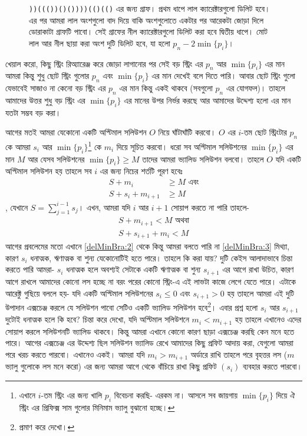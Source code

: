 \begin{solution}
\begin{figure}[h]
  \caption{\texttt{))((())()())))(()(()} এর জন্য গ্রাফ। প্রথম ধাপে লাল ক্যারেক্টারগুলো ডিলিট হবে। এর পর আমরা লাল অংশগুলো বাদ দিয়ে বাকি অংশগুলোতে একটার পর আরেকটা জোড়া দিলে ডোরাকাটা গ্রাফটি পাবো। সেই গ্রাফের নীল ক্যারেক্টারগুলো ডিলিট করা হবে দ্বিতীয় ধাপে। মোট লাল আর নীল ছায়া করা অংশ দুটি  ডিলিট হবে, যা হলো $p_n - 2\min\{p_i\}$।}
\end{figure}
খেয়াল করো, কিছু স্ট্রিং রিঅ্যারেঞ্জ করে জোড়া লাগানোর পর সেই বড় স্ট্রিং এর $p_n$ আর $\min\{p_i\}$ এর মান আমরা কিন্তু শুধু ছোট স্ট্রিং গুলোর $p_n$ এবং $\min\{p_i\}$ এর মান দেখেই বলে দিতে পারি। আবার ছোট স্ট্রিং গুলো যেভাবেই সাজাও না কেনো বড় স্ট্রিং এর $p_n$ এর মান কিন্তু একই থাকবে (সবগুলো $p_n$ এর যোগফল)। তাহলে আমাদের উত্তর শুধু বড় স্ট্রিং এর $\min\{p_i\}$ এর মানের উপর নির্ভর করছে আর আমাদের উদ্দেশ্য হলো এর মান যতটা সম্ভব বড় করা।

আগের মতই আমরা যেকোনো একটি অপ্টিমাল সলিউশন $O$ নিয়ে ঘাঁটাঘাঁটি করবো। $O$ এর $i$-তম ছোট স্ট্রিংটার $p_n$ কে আমরা $s_i$ আর $\min\{p_i\}$\footnote{এখানে $i$-তম স্ট্রিং এর জন্য খালি $p_i$ বিবেচনা করছি- এরকম না। আসলে সব জায়গায় $\min\{p_i\}$ দিয়ে ঐ স্ট্রিং এর প্রিফিক্স সাম গুলোর মিনিমাম ভ্যালু বুঝানো হচ্ছে।} কে $m_i$ দিয়ে সূচিত করবো। ধরো সব অপ্টিমাল সলিউশনের $\min\{p_i\}$ এর মান $M$ আর যেসব সলিউশনের $\min\{p_i\} \ge M$ তাদের আমরা ভ্যালিড সলিউশন বলবো। তাহলে $O$ যদি একটি অপ্টিমাল সলিউশন হয় তাহলে সব $i$ এর জন্য নিচের শর্তটি পূরণ হবেঃ
\begin{align}
  S + m_i &\ge M \text{ এবং} \label{delMinBra:1}\\
  S + s_i + m_{i+1} &\ge M \label{delMinBra:2}
\end{align}
, যেখানে $S = \sum_{j=1}^{i-1} s_j$। এখন, আমরা যদি $i$ আর $i+1$ সোয়াপ করতে না পারি তাহলে-
\begin{align}
  S + m_{i+1} < M \text{ অথবা} \label{delMinBra:3} \\
  S + s_{i+1} + m_i < M \label{delMinBra:4}
\end{align}
আগের প্রবলেমের মতো এখানে \eqref{delMinBra:2} থেকে কিন্তু আমরা বলতে পারি না \eqref{delMinBra:3} মিথ্যা, কারণ $s_i$ ধনাত্মক, ঋণাত্মক বা শুন্য যেকোনোটিই হতে পারে। তাহলে কি করা যায়? দুটি কেইস আলাদাভাবে চিন্তা করতে পারি আমরা- $s_i$ ধনাত্মক হলে  অবশ্যই সেটাকে একটি  ঋণাত্মক বা শুন্য $s_{i+1}$ এর আগে রাখা উচিত, কারণ আগে রাখলে আমাদের কোনো লস হচ্ছে না বরং পরের কোনো স্ট্রিং-এ এই লাভটা কাজে লেগে যেতে পারে। এটাকে আরেক্টু গুছিয়ে বললে হয়- যদি একটি অপ্টিমাল সলিউশনের $s_i \le 0$ এবং $s_{i+1} > 0$ হয় তাহলে আমরা এই দুটি উপাদান এক্সচেঞ্জ করলে যে সলিউশন পাবো সেটিও একটি ভ্যালিড সলিউশন হবে\footnote{প্রমাণ করে দেখো।}। এবার প্রশ্ন হলো $s_i$ আর $s_{i+1}$ দুটোই ধনাত্মক হলে কি হবে? চিন্তা করে দেখো, যদি অপ্টিমাল সলিউশনে $m_i < m_{i+1}$ হয় তাহলে এখানেও এদের সোয়াপ করলে সলিউশনটি ভ্যালিড থাকবে। কিন্তু আমরা এখানে কোনো কারণ ছাড়া এক্সচেঞ্জ করছি কেন মনে হতে পারে। আগের এক্সচেঞ্জ এর উদ্দেশ্য ছিল সলিউশন ভ্যালিড রেখে আমাদের কিছু প্রফিট আদায় করা, যেগুলো আমরা পরে খরচ করতে পারবো। এখানেও একই। আমরা যদি $m_i > m_{i+1}$ অর্ডারে রাখি তাহলে পরে বৃহত্তর লস ($m$ ভ্যালু গুলোকে লস মনে করো) এর জন্য আমরা আগে থেকে বাঁচিয়ে রাখা কিছু প্রফিট $(s_i)$ ব্যবহার করতে পারবো।\\

\end{solution}
